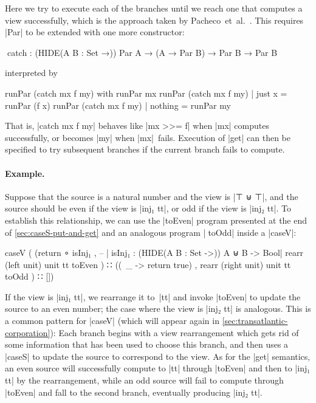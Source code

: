 \documentclass{sigplanconf}
\begin{document}
Here we try to execute each of the branches until we reach one that computes a view successfully, which is the approach taken by Pacheco~et~al.~\cite{Pacheco-putlenses}.
This requires |Par| to be extended with one more constructor:%
\begin{code}
^^^catch : (HIDE({A B : Set} →)) Par A → (A → Par B) → Par B → Par B
\end{code}
interpreted by
\begin{code}
runPar (catch mx f my) with runPar mx
runPar (catch mx f my) | just x   = runPar (f x)
runPar (catch mx f my) | nothing  = runPar my
\end{code}
That is, |catch mx f my| behaves like |mx >>= f| when |mx| computes successfully, or becomes |my| when |mx|~fails.
Execution of |get| can then be specified to try subsequent branches if the current branch fails to compute.

\paragraph{Example.}
Suppose that the source is a natural number and the view is |⊤ ⊎ ⊤|, and the source should be even if the view is |inj₁ tt|, or odd if the view is |inj₂ tt|.
To establish this relationship, we can use the |toEven| program presented at the end of \autoref{sec:caseS-put-and-get} and an analogous program |^^^toOdd| inside a |caseV|:
\begin{code}
caseV (  (return ∘ isInj₁ ,  -- |^^^isInj₁ : (HIDE({A B : Set} ->)) A ⊎ B -> Bool|
           rearr (left   unit) unit tt toEven  ) ∷
         ((\ _ -> return true) ,
           rearr (right  unit) unit tt toOdd   ) ∷ [])
\end{code}
If the view is |inj₁ tt|, we rearrange it to~|tt| and invoke |toEven| to update the source to an even number; the case where the view is |inj₂ tt| is analogous.
This is a common pattern for |caseV| (which will appear again in \autoref{sec:transatlantic-corporation}): Each branch begins with a view rearrangement which gets rid of some information that has been used to choose this branch, and then uses a |caseS| to update the source to correspond to the view.
As for the |get| semantics, an even source will successfully compute to |tt| through |toEven| and then to |inj₁ tt| by the rearrangement, while an odd source will fail to compute through |toEven| and fall to the second branch, eventually producing |inj₂ tt|.
\end{document}
